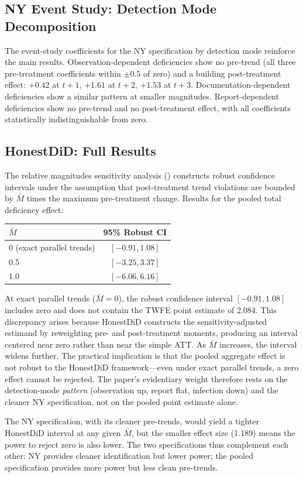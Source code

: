 \documentclass[12pt]{article}
\begin{document}
\subsection{NY Event Study: Detection Mode Decomposition}

The event-study coefficients for the NY specification by detection mode reinforce the main results. Observation-dependent deficiencies show no pre-trend (all three pre-treatment coefficients within $\pm 0.5$ of zero) and a building post-treatment effect: $+0.42$ at $t+1$, $+1.61$ at $t+2$, $+1.53$ at $t+3$. Documentation-dependent deficiencies show a similar pattern at smaller magnitudes. Report-dependent deficiencies show no pre-trend and no post-treatment effect, with all coefficients statistically indistinguishable from zero.

\subsection{HonestDiD: Full Results}

The relative magnitudes sensitivity analysis (\citealt{rambachan2023}) constructs robust confidence intervals under the assumption that post-treatment trend violations are bounded by $\bar{M}$ times the maximum pre-treatment change. Results for the pooled total deficiency effect:

\begin{center}
\begin{tabular}{lc}
\toprule
$\bar{M}$ & 95\% Robust CI \\
\midrule
0 (exact parallel trends) & $[-0.91, 1.08]$ \\
0.5 & $[-3.25, 3.37]$ \\
1.0 & $[-6.06, 6.16]$ \\
\bottomrule
\end{tabular}
\end{center}

At exact parallel trends ($\bar{M} = 0$), the robust confidence interval $[-0.91, 1.08]$ includes zero and does not contain the TWFE point estimate of 2.084. This discrepancy arises because HonestDiD constructs the sensitivity-adjusted estimand by reweighting pre- and post-treatment moments, producing an interval centered near zero rather than near the simple ATT. As $\bar{M}$ increases, the interval widens further. The practical implication is that the pooled aggregate effect is not robust to the HonestDiD framework---even under exact parallel trends, a zero effect cannot be rejected. The paper's evidentiary weight therefore rests on the detection-mode \textit{pattern} (observation up, report flat, infection down) and the cleaner NY specification, not on the pooled point estimate alone.

The NY specification, with its cleaner pre-trends, would yield a tighter HonestDiD interval at any given $\bar{M}$, but the smaller effect size (1.189) means the power to reject zero is also lower. The two specifications thus complement each other: NY provides cleaner identification but lower power; the pooled specification provides more power but less clean pre-trends.
\end{document}
